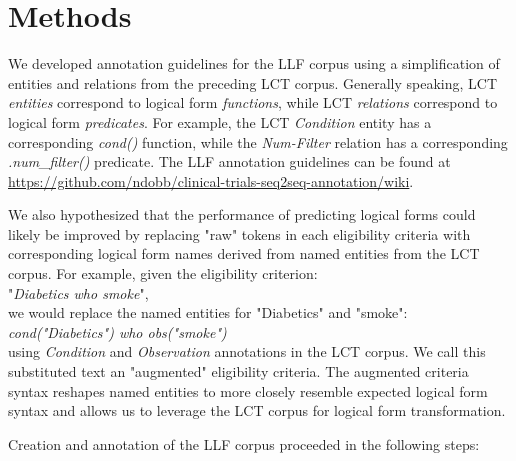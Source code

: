 \documentclass[../main.tex]{subfiles}
\begin{document}
\section{Methods}

We developed annotation guidelines for the LLF corpus using a simplification of entities and relations from the preceding LCT corpus\cite{dobbins2022leaf}. Generally speaking, LCT \textit{entities} correspond to logical form \textit{functions}, while LCT \textit{relations} correspond to logical form \textit{predicates}. For example, the LCT \textit{Condition} entity has a corresponding \textit{cond()} function, while the \textit{Num-Filter} relation has a corresponding \textit{.num\_filter()} predicate. The LLF annotation guidelines can be found at \url{https://github.com/ndobb/clinical-trials-seq2seq-annotation/wiki}.

We also hypothesized that the performance of predicting logical forms could likely be improved by replacing "raw" tokens in each eligibility criteria with corresponding logical form names derived from named entities from the LCT corpus. For example, given the eligibility criterion: \\

"\textit{Diabetics who smoke}", \\

\noindent we would replace the named entities for "Diabetics" and "smoke": \\ 

\textit{cond("Diabetics") who obs("smoke")} \\

\noindent using \textit{Condition} and \textit{Observation} annotations in the LCT corpus. We call this substituted text an "augmented" eligibility criteria. The augmented criteria syntax reshapes named entities to more closely resemble expected logical form syntax and allows us to leverage the LCT corpus for logical form transformation.

Creation and annotation of the LLF corpus proceeded in the following steps:
\end{document}
